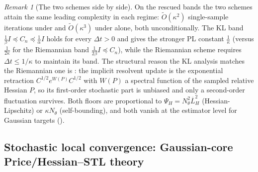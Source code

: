 \documentclass[11pt]{article}
\theoremstyle{plain}
\theoremstyle{definition}
\theoremstyle{remark}
\newtheorem{remark}[remark]{Remark}
\newcommand{\Id}{I}
\newcommand{\barLH}{\overline{L}_H}
\begin{document}
\begin{remark}[The two schemes side by side]
\label{rem:KL-vs-Riem}
On the rescued bands the two schemes attain the same leading complexity in each regime:
$\widetilde O(\kappa^2)$ single-sample iterations under  and
$\widetilde O(\kappa^3)$ under  alone, both unconditionally. The KL band
$\tfrac1\beta\Id\preceq C_n\preceq\tfrac1\alpha\Id$ holds for every $\Delta t>0$ and gives the
stronger PL constant $\tfrac1\kappa$ (versus $\tfrac1{2\kappa}$ for the Riemannian band
$\tfrac1{2\beta}\Id\preceq C_n$), while the Riemannian scheme requires $\Delta t\leq1/\kappa$ to
maintain its band. The structural reason the KL analysis matches the Riemannian one is
: the implicit resolvent update is the exponential retraction
$C^{1/2}e^{W(P)}C^{1/2}$ with $W(P)$ a spectral function of the sampled relative Hessian $P$, so its
first-order stochastic part is unbiased and only a second-order fluctuation survives. Both floors are
proportional to $\Psi_H=N_\theta^2\barLH^2$ (Hessian-Lipschitz) or $\kappa N_\theta$ (self-bounding),
and both vanish at the estimator level for Gaussian targets ().
\end{remark}
\subsection{Stochastic local convergence: Gaussian-core Price/Hessian--STL theory}
\label{sec:stoch-local}
\end{document}
